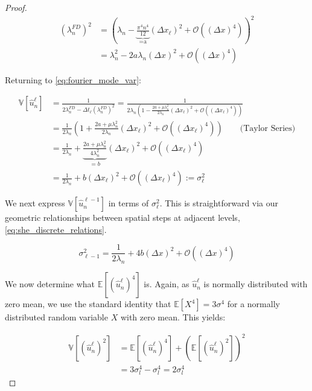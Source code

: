 \begin{proof}
    \begin{align*}
        (\lambda_n^{FD})^2 &= (\lambda_n - 
        \underbrace{\frac{\pi^4 n^4}{12}}_{\text{=a}}(\Delta x_\ell)^2
         + \mathcal{O}((\Delta x)^4))^2\\
         &= \lambda_n^2 - 2 a \lambda_n (\Delta x)^2 + 
         \mathcal{O}((\Delta x)^4)
    \end{align*}

    Returning to \eqref{eq:fourier_mode_var}:

    \begin{align*}
        \mathbb{V}[\hat{u}_n^\ell] &= \frac{1}{2 \lambda_n^{FD} - 
        \Delta t_\ell (\lambda_n^{FD})^2} = 
        \frac{1}{2\lambda_n\left(1 - \frac{2a + \mu \lambda_n^2}{2\lambda_n}
        (\Delta x_\ell)^2 + \mathcal{O}\left((\Delta x_\ell)^4\right)\right)} \\
        &= \frac{1}{2 \lambda_n} \left(1 + 
        \frac{2a + \mu \lambda_n^2}{2 \lambda_n} (\Delta x_\ell)^2
        + \mathcal{O}\left((\Delta x_\ell)^4\right) \right)
        \qquad \text{(Taylor Series)} \\
        &= \frac{1}{2\lambda_n} + 
        \underbrace{\frac{2a + \mu \lambda_n^2}{4\lambda_n^2}}_{=b}(\Delta x_\ell)^2
        + \mathcal{O}\left((\Delta x_\ell)^4\right)
        \\
        &= \frac{1}{2\lambda_n} + 
        b(\Delta x_\ell)^2
        + \mathcal{O}\left((\Delta x_\ell)^4\right) := \sigma_\ell^2
    \end{align*}

    We next express $\mathbb{V}[\hat{u}_n^{\ell-1}]$ in terms of 
    $\sigma_\ell^2$. This is straightforward via our geometric relationships
    between spatial steps at adjacent levels, 
    \eqref{eq:she_discrete_relations}.

    \begin{equation}\label{eq:sigma_ell_1_var}
        \sigma_{\ell-1}^2 = \frac{1}{2\lambda_n} + 4b(\Delta x)^2 + 
        \mathcal{O}\left((\Delta x)^4\right)
    \end{equation}

    We now determine what $\mathbb{E}\left[(\hat{u}_n^\ell)^4\right]$ is.
    Again, as $\hat{u}_n^\ell$ is normally distributed with zero mean, we use
    the standard identity that $\mathbb{E}[X^4] = 3 \sigma^4$ for 
    a normally distributed random variable $X$ with zero mean.
    This yields:

    \begin{align*}
        \mathbb{V}[(\hat{u}_n^\ell)^2] &= 
        \mathbb{E}[(\hat{u}_n^\ell)^4] + 
        \left(\mathbb{E}[(\hat{u}_n^\ell)^2]\right)^2 \\
        &= 3\sigma_l^4 - \sigma_l^4 = 2\sigma_l^4
    \end{align*}


\end{proof}
